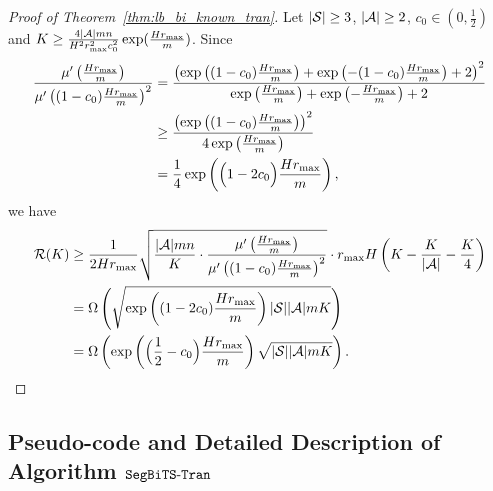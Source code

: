 \begin{proof}[Proof of Theorem~\ref{thm:lb_bi_known_tran}]
	
	Let $|\mathcal{S}|\geq 3$, $|\mathcal{A}|\geq 2$, $c_0 \in (0,\frac{1}{2})$ and $K \geq \frac{4 |\mathcal{A}| m n}{H^2 r_{\max}^2 c_0^2} \exp( \frac{Hr_{\max}}{m} )$. 
	Since 
	\begin{align*}
		\frac{ \mu'\left(  \frac{Hr_{\max}}{m}  \right) }{ \mu'\left(  (1-c_0) \frac{Hr_{\max}}{m}  \right)^2 } &= \frac{ \left(  \exp\left(  (1-c_0) \frac{Hr_{\max}}{m}  \right) + \exp\left(  - (1-c_0) \frac{Hr_{\max}}{m}  \right) +2  \right)^2 }{ \exp\left(  \frac{Hr_{\max}}{m}  \right) + \exp\left(  - \frac{Hr_{\max}}{m}  \right) + 2 }
		\\
		&\geq \frac{ \left(  \exp\left(  (1-c_0) \frac{Hr_{\max}}{m}  \right)  \right)^2 }{ 4\exp\left(  \frac{Hr_{\max}}{m}  \right) }
		\\
		&= \frac{1}{4} \exp\left(  \Big(1-2c_0\Big) \frac{Hr_{\max}}{m}  \right)   ,
	\end{align*}
	we have 
	\begin{align*}
		\mathcal{R}(K) &\geq \frac{1}{2 Hr_{\max}} \sqrt{ \frac{|\mathcal{A}| m n}{K} \cdot \frac{ \mu'\left(  \frac{Hr_{\max}}{m}  \right) }{ \mu'\left(  (1-c_0) \frac{Hr_{\max}}{m}  \right)^2 } } \cdot r_{\max} H \left( K - \frac{K}{|\mathcal{A}|} - \frac{K}{4}  \right)
		\\&= \Omega\left(   \sqrt{\exp\left(  (1-2c_0) \frac{Hr_{\max}}{m}  \right)  |\mathcal{S}| |\mathcal{A}| m K }  \right) 
		\\
		&= \Omega\left(  \exp\left(  \Big(\frac{1}{2}-c_0\Big) \frac{Hr_{\max}}{m}  \right)  \sqrt{ |\mathcal{S}| |\mathcal{A}| m K }  \right) .
	\end{align*}
\end{proof}


\subsection{Pseudo-code and Detailed Description of Algorithm $\mathtt{SegBiTS\mbox{-}Tran}$} \label{apx:alg_bi_unknown_tran}


